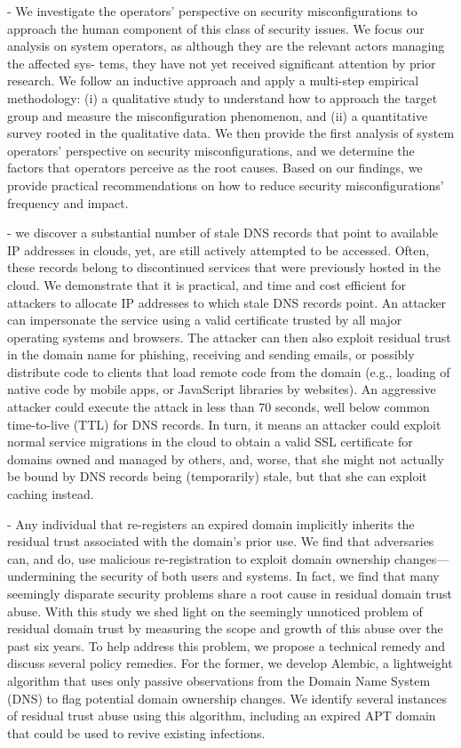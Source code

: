 \cite{dietrich2018investigating} - We investigate the operators’ perspective on security misconfigurations to approach the human component of this class of security issues. We focus our analysis on system operators, as although they are the relevant actors managing the affected sys- tems, they have not yet received significant attention by prior research. We follow an inductive approach and apply a multi-step empirical methodology: (i) a qualitative study to understand how to approach the target group and measure the misconfiguration phenomenon, and (ii) a quantitative survey rooted in the qualitative data. We then provide the first analysis of system operators’ perspective on security misconfigurations, and we determine the factors that operators perceive as the root causes. Based on our findings, we provide practical recommendations on how to reduce security misconfigurations’ frequency and impact.


\cite{borgolte2018cloud} - we discover a substantial number of stale DNS records that point to available IP addresses in clouds, yet, are still actively attempted to be accessed. Often, these records belong to discontinued services that were previously hosted in the cloud. We demonstrate that it is practical, and time and cost efficient for attackers to allocate IP addresses to which stale DNS records point. An attacker can impersonate the service using a valid certificate trusted by all major operating systems and browsers. The attacker can then also exploit residual trust in the domain name for phishing, receiving and sending emails, or possibly distribute code to clients that load remote code from the domain (e.g., loading of native code by mobile apps, or JavaScript libraries by websites). An aggressive attacker could execute the attack in less than 70 seconds, well below common time-to-live (TTL) for DNS records. In turn, it means an attacker could exploit normal service migrations in the cloud to obtain a valid SSL certificate for domains owned and managed by others, and, worse, that she might not actually be bound by DNS records being (temporarily) stale, but that she can exploit caching instead.

\cite{lever2016domain} - Any individual that re-registers an expired domain implicitly inherits the residual trust associated with the domain’s prior use. We find that adversaries can, and do, use malicious re-registration to exploit domain ownership changes—undermining the security of both users and systems. In fact, we find that many seemingly disparate security problems share a root cause in residual domain trust abuse. With this study we shed light on the seemingly unnoticed problem of residual domain trust by measuring the scope and growth of this abuse over the past six years. To help address this problem, we propose a technical remedy and discuss several policy remedies. For the former, we develop Alembic, a lightweight algorithm that uses only passive observations from the Domain Name System (DNS) to flag potential domain ownership changes. We identify several instances of residual trust abuse using this algorithm, including an expired APT domain that could be used to revive existing infections.

